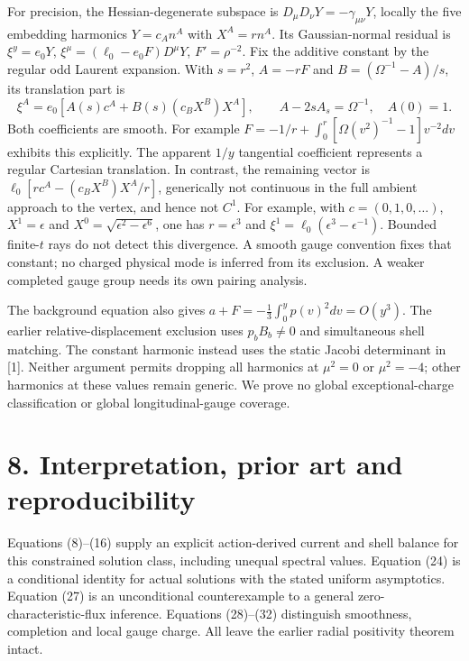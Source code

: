 \documentclass[
  11pt,
]{article}
\begin{document}
For precision, the Hessian-degenerate subspace is
\(D_\mu D_\nu Y=-\gamma_{\mu\nu}Y\), locally the five embedding
harmonics \(Y=c_An^A\) with \(X^A=rn^A\). Its Gaussian-normal residual
is \(\xi^y=e_0Y\), \(\xi^\mu=(\ell_0-e_0F)D^\mu Y\), \(F'=\rho^{-2}\).
Fix the additive constant by the regular odd Laurent expansion. With
\(s=r^2\), \(A=-rF\) and \(B=(\Omega^{-1}-A)/s\), its translation part
is \[
 \xi^A=e_0[A(s)c^A+B(s)(c_BX^B)X^A],\qquad
 A-2sA_s=\Omega^{-1},\quad A(0)=1.                    \tag{32}
\] Both coefficients are smooth. For example
\(F=-1/r+\int_0^r[\Omega(v^2)^{-1}-1]v^{-2}dv\) exhibits this
explicitly. The apparent \(1/y\) tangential coefficient represents a
regular Cartesian translation. In contrast, the remaining vector is
\(\ell_0[rc^A-(c_BX^B)X^A/r]\), generically not continuous in the full
ambient approach to the vertex, and hence not \(C^1\). For example, with
\(c=(0,1,0,\ldots)\), \(X^1=\epsilon\) and
\(X^0=\sqrt{\epsilon^2-\epsilon^6}\), one has \(r=\epsilon^3\) and
\(\xi^1=\ell_0(\epsilon^3-\epsilon^{-1})\). Bounded finite-\(t\) rays do
not detect this divergence. A smooth gauge convention fixes that
constant; no charged physical mode is inferred from its exclusion. A
weaker completed gauge group needs its own pairing analysis.

The background equation also gives
\(a+F=-\frac13\int_0^yp(v)^2dv=O(y^3)\). The earlier
relative-displacement exclusion uses \(p_bB_b\ne0\) and simultaneous
shell matching. The constant harmonic instead uses the static Jacobi
determinant in {[}1{]}. Neither argument permits dropping all harmonics
at \(\mu^2=0\) or \(\mu^2=-4\); other harmonics at these values remain
generic. We prove no global exceptional-charge classification or global
longitudinal-gauge coverage.

\section{8. Interpretation, prior art and
reproducibility}\label{interpretation-prior-art-and-reproducibility}

Equations (8)--(16) supply an explicit action-derived current and shell
balance for this constrained solution class, including unequal spectral
values. Equation (24) is a conditional identity for actual solutions
with the stated uniform asymptotics. Equation (27) is an unconditional
counterexample to a general zero-characteristic-flux inference.
Equations (28)--(32) distinguish smoothness, completion and local gauge
charge. All leave the earlier radial positivity theorem intact.
\end{document}
